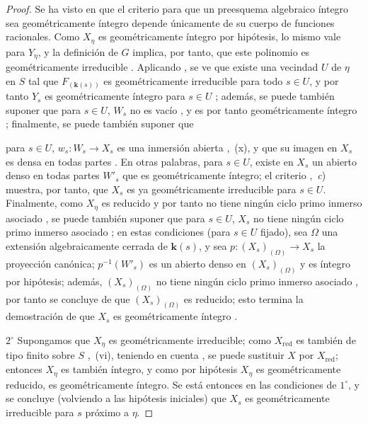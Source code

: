 \begin{proof}
Se ha visto en  que el criterio para que un preesquema algebraico íntegro sea geométricamente íntegro depende únicamente de su cuerpo de funciones racionales. Como $X_\eta$ es geométricamente íntegro por hipótesis, lo mismo vale para $Y_\eta$, y la definición de $G$ implica, por tanto, que este polinomio es geométricamente irreducible .
Aplicando , se ve que existe una vecindad $U$ de $\eta$ en $S$ tal que $F_{(\mathbf{k}(s))}$ es geométricamente irreducible para todo $s\in U$, y por tanto $Y_s$ es geométricamente íntegro para $s\in U$ ; además, se puede también suponer que para $s\in U$, $W_s$ no es vacío , y es por tanto geométricamente íntegro ; finalmente, se puede también suponer que


para $s\in U$, $w_s:W_s\to X_s$ es una inmersión abierta ,~(x), y que su imagen en $X_s$ es densa en todas partes .
En otras palabras, para $s\in U$, existe en $X_s$ un abierto denso en todas partes $W'_s$ que es geométricamente íntegro; el criterio ,~\emph{c}) muestra, por tanto, que $X_s$ es ya geométricamente irreducible para $s\in U$.
Finalmente, como $X_\eta$ es reducido y por tanto no tiene ningún ciclo primo inmerso asociado , se puede también suponer que para $s\in U$, $X_s$ no tiene ningún ciclo primo inmerso asociado ; en estas condiciones (para $s\in U$ fijado), sea $\Omega$ una extensión algebraicamente cerrada de $\boldsymbol{k}(s)$, y sea $p:(X_s)_{(\Omega)}\to X_s$ la proyección canónica; $p^{-1}(W'_s)$ es un abierto denso en $(X_s)_{(\Omega)}$  y es íntegro por hipótesis; además, $(X_s)_{(\Omega)}$ no tiene ningún ciclo primo inmerso asociado , por tanto se concluye de  que $(X_s)_{(\Omega)}$ es reducido; esto termina la demostración de que $X_s$ es geométricamente íntegro .

$2^\circ$ Supongamos que $X_\eta$ es geométricamente irreducible; como $X_{\mathrm{red}}$ es también de tipo finito sobre $S$ ,~(vi), teniendo en cuenta , se puede sustituir $X$ por $X_{\mathrm{red}}$; entonces $X_\eta$ es también íntegro, y como por hipótesis $X_\eta$ es geométricamente reducido, es geométricamente íntegro. Se está entonces en las condiciones de $1^\circ$, y se concluye (volviendo a las hipótesis iniciales) que $X_s$ es geométricamente irreducible para $s$ próximo a $\eta$.


\end{proof}

